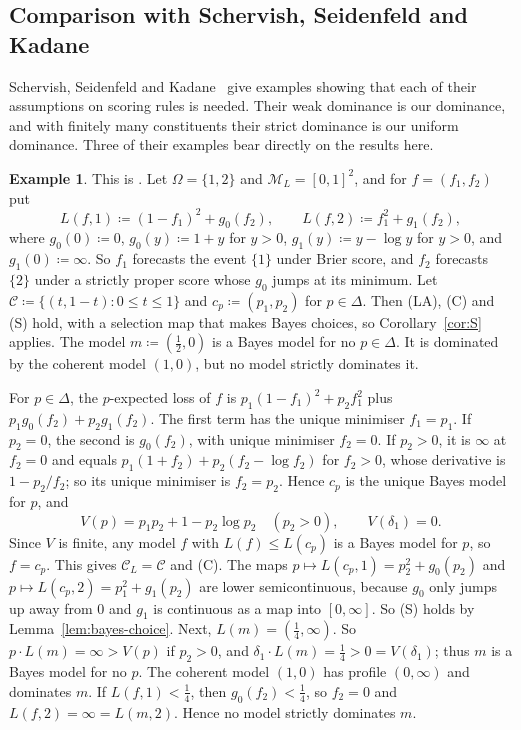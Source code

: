 \documentclass[11pt]{article}
\theoremstyle{definition}
\newtheorem{example}[theorem]{Example}
\theoremstyle{remark}
\newcommand{\M}{\mathcal M}
\newcommand{\C}{\mathcal C}
\begin{document}
\subsection{Comparison with Schervish, Seidenfeld and Kadane}\label{sec:ssk}
Schervish, Seidenfeld and Kadane~\cite{SSK09} give examples showing that each of their assumptions on scoring rules is needed. Their weak dominance is our dominance, and with finitely many constituents their strict dominance is our uniform dominance. Three of their examples bear directly on the results here.
\begin{example}\label{ex:ssk-sharp}
This is \cite[Example~2]{SSK09}. Let $\Omega=\{1,2\}$ and $\M_L=[0,1]^2$, and for $f=(f_1,f_2)$ put
\[
 L(f,1)\coloneqq (1-f_1)^2+g_0(f_2),\qquad L(f,2)\coloneqq f_1^2+g_1(f_2),
\]
where $g_0(0)\coloneqq 0$, $g_0(y)\coloneqq 1+y$ for $y>0$, $g_1(y)\coloneqq y-\log y$ for $y>0$, and $g_1(0)\coloneqq \infty$. So $f_1$ forecasts the event $\{1\}$ under Brier score, and $f_2$ forecasts $\{2\}$ under a strictly proper score whose $g_0$ jumps at its minimum. Let $\C\coloneqq \{(t,1-t):0\le t\le1\}$ and $c_p\coloneqq (p_1,p_2)$ for $p\in\Delta$. Then (LA), (C) and (S) hold, with a selection map that makes Bayes choices, so Corollary~\ref{cor:S} applies. The model $m\coloneqq (\tfrac12,0)$ is a Bayes model for no $p\in\Delta$. It is dominated by the coherent model $(1,0)$, but no model strictly dominates it.
\end{example}
For $p\in\Delta$, the $p$-expected loss of $f$ is $p_1(1-f_1)^2+p_2f_1^2$ plus $p_1g_0(f_2)+p_2g_1(f_2)$. The first term has the unique minimiser $f_1=p_1$. If $p_2=0$, the second is $g_0(f_2)$, with unique minimiser $f_2=0$. If $p_2>0$, it is $\infty$ at $f_2=0$ and equals $p_1(1+f_2)+p_2(f_2-\log f_2)$ for $f_2>0$, whose derivative is $1-p_2/f_2$; so its unique minimiser is $f_2=p_2$. Hence $c_p$ is the unique Bayes model for $p$, and
\[
 V(p)=p_1p_2+1-p_2\log p_2\quad(p_2>0),\qquad V(\delta_1)=0.
\]
Since $V$ is finite, any model $f$ with $L(f)\le L(c_p)$ is a Bayes model for $p$, so $f=c_p$. This gives $\C_L=\C$ and (C). The maps $p\mapsto L(c_p,1)=p_2^2+g_0(p_2)$ and $p\mapsto L(c_p,2)=p_1^2+g_1(p_2)$ are lower semicontinuous, because $g_0$ only jumps up away from $0$ and $g_1$ is continuous as a map into $[0,\infty]$. So (S) holds by Lemma~\ref{lem:bayes-choice}. Next, $L(m)=(\tfrac14,\infty)$. So $p\cdot L(m)=\infty>V(p)$ if $p_2>0$, and $\delta_1\cdot L(m)=\tfrac14>0=V(\delta_1)$; thus $m$ is a Bayes model for no $p$. The coherent model $(1,0)$ has profile $(0,\infty)$ and dominates $m$. If $L(f,1)<\tfrac14$, then $g_0(f_2)<\tfrac14$, so $f_2=0$ and $L(f,2)=\infty=L(m,2)$. Hence no model strictly dominates $m$.
\end{document}
